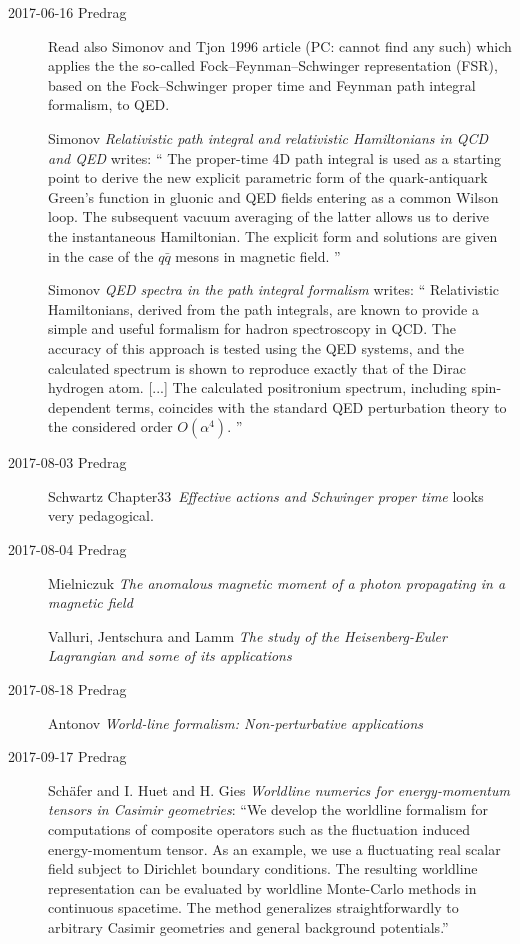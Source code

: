 \begin{description}
\item[2017-06-16 Predrag]
Read also Simonov and Tjon 1996 article (PC: cannot find any such) which applies
the the so-called Fock–Feynman–Schwinger representation (FSR), based on the
Fock–Schwinger proper time and Feynman path integral formalism,
to QED.



Simonov
{\em Relativistic path integral and relativistic {Hamiltonians}
in {QCD and QED}} writes:
``
The proper-time 4D path integral is used as a starting point to derive
the new explicit parametric form of the quark-antiquark Green's function
in gluonic and QED fields entering as a common Wilson loop. The
subsequent vacuum averaging of the latter allows us to derive the
instantaneous Hamiltonian. The explicit form and solutions are given in
the case of the $q\bar{q}$ mesons in magnetic field.
''

Simonov
{\em {QED} spectra in the path integral formalism} writes:
``
Relativistic Hamiltonians, derived from the path integrals, are known to
provide a simple and useful formalism for hadron spectroscopy in QCD. The
accuracy of this approach is tested using the QED systems, and the
calculated spectrum is shown to reproduce exactly that of the Dirac
hydrogen atom. [...] The calculated positronium spectrum, including
spin-dependent terms, coincides with the standard QED perturbation theory
to the considered order $O(\alpha^4)$.
''

\item[2017-08-03 Predrag]
Schwartz
{Chapter33}~{\em Effective actions and Schwinger
proper time} looks very pedagogical.

\item[2017-08-04 Predrag]
Mielniczuk \etal{}
{\em The anomalous magnetic moment of a photon propagating in a magnetic field}

Valluri, Jentschura and Lamm
{\em The study of the {Heisenberg-Euler Lagrangian} and some of its applications}


\item[2017-08-18 Predrag]
Antonov
{\em World-line formalism: {Non-perturbative} applications}

\item[2017-09-17 Predrag]
Sch{\"a}fer and I. Huet and H. Gies
{\em Worldline numerics for energy-momentum tensors in {Casimir} geometries}:
``We develop the worldline formalism for computations of composite operators
such as the fluctuation induced energy-momentum tensor. As an example, we use
a fluctuating real scalar field subject to Dirichlet boundary conditions. The
resulting worldline representation can be evaluated by worldline Monte-Carlo
methods in continuous spacetime. The method generalizes straightforwardly
to arbitrary Casimir geometries and general background potentials.''



\end{description}
